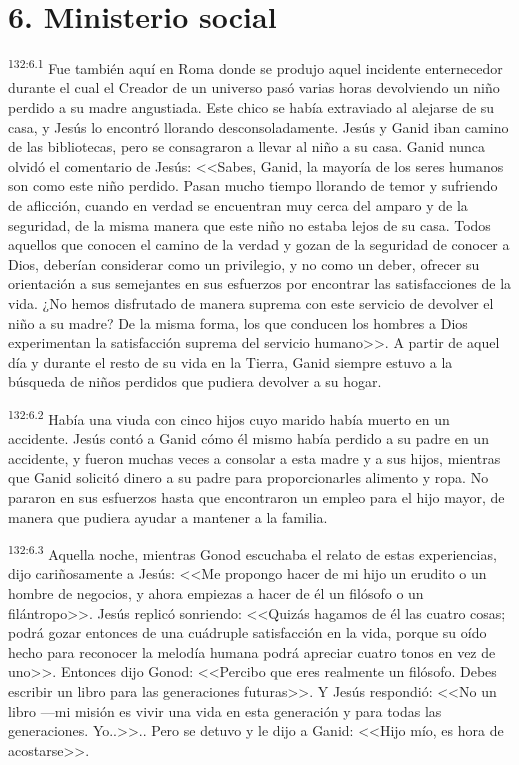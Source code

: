 \section*{6. Ministerio social}
\par 
\textsuperscript{132:6.1} Fue también aquí en Roma donde se produjo aquel incidente enternecedor durante el cual el Creador de un universo pasó varias horas devolviendo un niño perdido a su madre angustiada. Este chico se había extraviado al alejarse de su casa, y Jesús lo encontró llorando desconsoladamente. Jesús y Ganid iban camino de las bibliotecas, pero se consagraron a llevar al niño a su casa. Ganid nunca olvidó el comentario de Jesús: <<Sabes, Ganid, la mayoría de los seres humanos son como este niño perdido. Pasan mucho tiempo llorando de temor y sufriendo de aflicción, cuando en verdad se encuentran muy cerca del amparo y de la seguridad, de la misma manera que este niño no estaba lejos de su casa. Todos aquellos que conocen el camino de la verdad y gozan de la seguridad de conocer a Dios, deberían considerar como un privilegio, y no como un deber, ofrecer su orientación a sus semejantes en sus esfuerzos por encontrar las satisfacciones de la vida. ¿No hemos disfrutado de manera suprema con este servicio de devolver el niño a su madre? De la misma forma, los que conducen los hombres a Dios experimentan la satisfacción suprema del servicio humano>>. A partir de aquel día y durante el resto de su vida en la Tierra, Ganid siempre estuvo a la búsqueda de niños perdidos que pudiera devolver a su hogar.

\par 
\textsuperscript{132:6.2} Había una viuda con cinco hijos cuyo marido había muerto en un accidente. Jesús contó a Ganid cómo él mismo había perdido a su padre en un accidente, y fueron muchas veces a consolar a esta madre y a sus hijos, mientras que Ganid solicitó dinero a su padre para proporcionarles alimento y ropa. No pararon en sus esfuerzos hasta que encontraron un empleo para el hijo mayor, de manera que pudiera ayudar a mantener a la familia.

\par 
\textsuperscript{132:6.3} Aquella noche, mientras Gonod escuchaba el relato de estas experiencias, dijo cariñosamente a Jesús: <<Me propongo hacer de mi hijo un erudito o un hombre de negocios, y ahora empiezas a hacer de él un filósofo o un filántropo>>. Jesús replicó sonriendo: <<Quizás hagamos de él las cuatro cosas; podrá gozar entonces de una cuádruple satisfacción en la vida, porque su oído hecho para reconocer la melodía humana podrá apreciar cuatro tonos en vez de uno>>. Entonces dijo Gonod: <<Percibo que eres realmente un filósofo. Debes escribir un libro para las generaciones futuras>>. Y Jesús respondió: <<No un libro ---mi misión es vivir una vida en esta generación y para todas las generaciones. Yo..>>.. Pero se detuvo y le dijo a Ganid: <<Hijo mío, es hora de acostarse>>.

